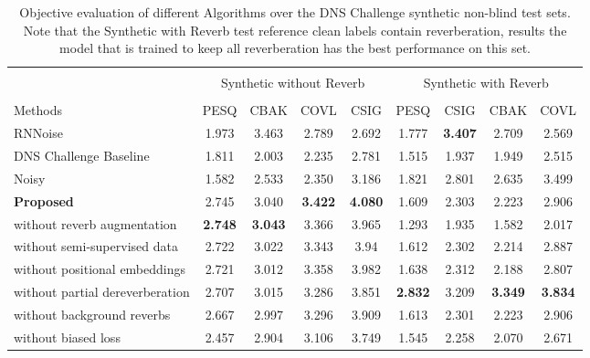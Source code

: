 \documentclass[english]{article}
\begin{document}
\begin{table*}[hbt!]
\vspace{-0.1in}
\footnotesize
\centering
\begin{tabular}{l|cccc|cccc} 
\hline \\[-2ex]
$\,$ & \multicolumn{4}{c|}{Synthetic without Reverb} & \multicolumn{4}{c}{Synthetic with Reverb}\\
\hline \\[-2ex]
Methods  &{PESQ} &{CBAK} &{COVL} &{CSIG}  &{PESQ} &{CSIG}  &{CBAK} &{COVL} \\
\hline

RNNoise \cite{valin2018rnnoise} 
& 1.973 & 3.463 & 2.789 & 2.692 & 1.777 & \bf{3.407} & 2.709 & 2.569 \\
DNS Challenge Baseline \cite{dnschallenge}    &
1.811 & 2.003 & 2.235 & 2.781 &
1.515 & 1.937 & 1.949 & 2.515 \\
Noisy & 1.582 & 2.533 & 2.350 & 3.186 & 1.821 & 2.801 & 2.635 & 3.499 \\
\bf{Proposed} & 2.745 & 3.040 & \bf{3.422} & \bf{4.080} & 1.609 & 2.303 & 2.223 & 2.906 \\
\hspace{0.07in}  without reverb augmentation & \bf{2.748} & \bf{3.043} & 3.366 & 3.965 & 1.293& 1.935 & 1.582 & 2.017 \\
\hspace{0.07in}  without semi-supervised data	& 2.722 & 3.022 & 3.343 & 3.94 & 1.612 & 2.302 & 2.214 & 2.887 \\
\hspace{0.07in}  without positional embeddings	& 2.721 & 3.012 & 3.358 & 3.982 & 1.638 & 2.312 & 2.188 & 2.807 \\
\hspace{0.07in}  without partial dereverberation	& 2.707 & 3.015 & 3.286 & 3.851  & \bf{2.832} & 3.209 & \bf{3.349} & \bf{3.834} \\
\hspace{0.07in}  without background reverbs	& 2.667 & 2.997 & 3.296 & 3.909 & 1.613 & 2.301 & 2.223 & 2.906 \\
\hspace{0.07in}  without biased loss & 2.457 & 2.904 & 3.106 & 3.749 & 1.545 & 2.258 & 2.070 & 2.671 \\
\hline 
\end{tabular}
\vspace{0.05in}
\caption{Objective evaluation of different Algorithms over the DNS Challenge synthetic non-blind test sets. Note that the Synthetic with Reverb test reference clean labels contain reverberation, results the model that is trained to keep all reverberation has the best performance on this set. 
}
\label{tableobjectivemetrics}
\vspace{-0.25in}
\end{table*}
\end{document}
